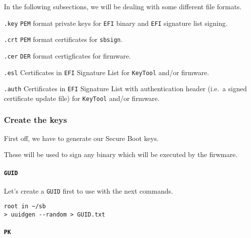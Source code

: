 \documentclass[10pt]{dustdoc}
\begin{document}
In the following subsections, we will be dealing with some different file formats.

\begin{sidebar}{\texttt{.key}}
    \texttt{PEM} format private keys for \texttt{EFI} binary and \texttt{EFI} signature list signing.
\end{sidebar}

\begin{sidebar}{\texttt{.crt}}
    \texttt{PEM} format certificates for \texttt{sbsign}.
\end{sidebar}

\begin{sidebar}{\texttt{.cer}}
    \texttt{DER} format certigficates for firmware.
\end{sidebar}

\begin{sidebar}{\texttt{.esl}}
    Certificates in \texttt{EFI} Signature List for \texttt{KeyTool} and/or firmware.
\end{sidebar}

\begin{sidebar}{\texttt{.auth}}
    Certificates in \texttt{EFI} Signature List with authentication header (i.e.\ a signed certificate update file) for \texttt{KeyTool} and/or firmware.
\end{sidebar}

\subsubsection{Create the keys}%
\label{sec:create-the-keys}

First off, we have to generate our Secure Boot keys.

These will be used to sign any binary which will be executed by the firwmare.

\paragraph{\texttt{GUID}}%
\label{par:guid}

Let’s create a \texttt{GUID} first to use with the next commands.

\begin{verbatim}
root in ~/sb
> uuidgen --random > GUID.txt
\end{verbatim}

\paragraph{\texttt{PK}}%
\label{par:pk}
\end{document}
